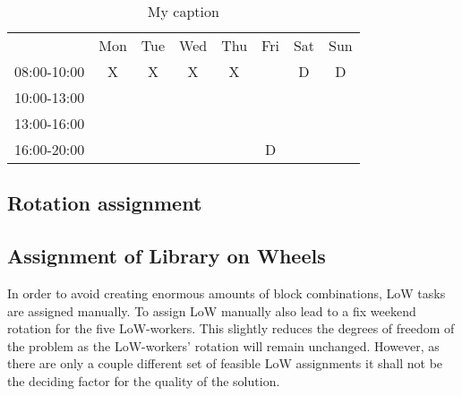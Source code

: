 \begin{table}[!h]
\centering
\caption{My caption}
\label{Friday_percolation}
\begin{tabular}{cccccccc}
                                 & Mon                    & Tue                    & Wed                    & Thu                    & Fri                                            & Sat                                            & Sun                                            \\ \cline{2-8} 
\multicolumn{1}{c|}{08:00-10:00} & \multicolumn{1}{c|}{X} & \multicolumn{1}{c|}{X} & \multicolumn{1}{c|}{X} & \multicolumn{1}{c|}{X} & \multicolumn{1}{c|}{\cellcolor[HTML]{000000}}  & \multicolumn{1}{c|}{\cellcolor[HTML]{FCFF2F}D} & \multicolumn{1}{c|}{\cellcolor[HTML]{FCFF2F}D} \\ \cline{2-8} 
\multicolumn{1}{c|}{10:00-13:00} & \multicolumn{1}{c|}{}  & \multicolumn{1}{c|}{}  & \multicolumn{1}{c|}{}  & \multicolumn{1}{c|}{}  & \multicolumn{1}{c|}{\cellcolor[HTML]{000000}}  &                                                &                                                \\ \cline{2-6}
\multicolumn{1}{c|}{13:00-16:00} & \multicolumn{1}{c|}{}  & \multicolumn{1}{c|}{}  & \multicolumn{1}{c|}{}  & \multicolumn{1}{c|}{}  & \multicolumn{1}{c|}{\cellcolor[HTML]{000000}}  &                                                &                                                \\ \cline{2-6}
\multicolumn{1}{c|}{16:00-20:00} & \multicolumn{1}{c|}{}  & \multicolumn{1}{c|}{}  & \multicolumn{1}{c|}{}  & \multicolumn{1}{c|}{}  & \multicolumn{1}{c|}{\cellcolor[HTML]{FCFF2F}D} &                                                &                                                \\ \cline{2-6}
\end{tabular}
\end{table}


\subsection{Rotation assignment} \label{rotation}


\subsection{Assignment of Library on Wheels} \label{LoW_assignment}
In order to avoid creating enormous amounts of block combinations, LoW tasks are assigned manually. To assign LoW manually also lead to a fix weekend rotation for the five LoW-workers. This slightly reduces the degrees of freedom of the problem as the LoW-workers' rotation will remain unchanged. However, as there are only a couple different set of feasible LoW assignments it shall not be the deciding factor for the quality of the solution.

